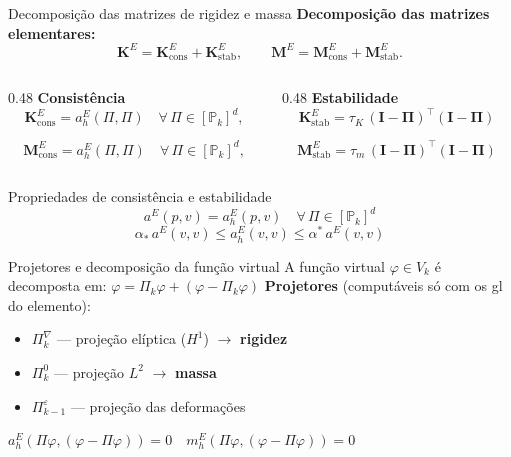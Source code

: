 \documentclass[aspectratio=169]{beamer}
\begin{document}
{\begin{frame}{Decomposição das matrizes de rigidez e massa}
  \textbf{Decomposição das matrizes elementares:}
  \[
    \mathbf{K}^E = \mathbf{K}_{\mathrm{cons}}^E + \mathbf{K}_{\mathrm{stab}}^E,
    \qquad
    \mathbf{M}^E = \mathbf{M}_{\mathrm{cons}}^E + \mathbf{M}_{\mathrm{stab}}^E.
  \]  
  \begin{columns}[T]
    \begin{column}{0.48\textwidth}
      \textbf{Consistência}
      \[
        \mathbf{K}_{\mathrm{cons}}^E  = a_h^E(\Pi,\Pi)\quad\forall\, \Pi \in[\mathbb{P}_k]^d,
      \]

      \[ \mathbf{M}_{\mathrm{cons}}^E  = a_h^E(\Pi,\Pi)\quad\forall\, \Pi \in[\mathbb{P}_k]^d,
      \]
    \end{column}
    \begin{column}{0.48\textwidth}
      \textbf{Estabilidade}
      \[
        \mathbf{K}_{\mathrm{stab}}^E = \tau_K\,
        (\mathbf{I}-\boldsymbol{\Pi})^\top
        (\mathbf{I}-\boldsymbol{\Pi})
      \]

      \[\mathbf{M}_{\mathrm{stab}}^E = \tau_m\,
        (\mathbf{I}-\boldsymbol{\Pi})^\top
        (\mathbf{I}-\boldsymbol{\Pi})
      \]
    \end{column}
  \end{columns}  
  \begin{block}{Propriedades de consistência e estabilidade}
      \[
        a^E(p,v) = a_h^E(p,v)
        \quad\forall\, \Pi \in[\mathbb{P}_k]^d
      \]  \[
        \alpha_*\, a^E(v,v) \leq
        a_h^E(v,v) \leq
        \alpha^*\, a^E(v,v)
      \]
  \end{block}
\end{frame}

\begin{frame}{Projetores e decomposição da função virtual}
  A função virtual $\varphi \in V_k$ é decomposta em: $\varphi = \Pi_k \varphi + (\varphi - \Pi_k \varphi)$
  \textbf{Projetores} (computáveis só com os gl do elemento):
  \vspace{1em}
  \begin{itemize}
    \item $\Pi_k^\nabla$ --- projeção elíptica ($H^1$) $\rightarrow$ \textbf{rigidez}
    \item $\Pi_k^0$ --- projeção $L^2$ $\rightarrow$ \textbf{massa}
    \item $\Pi_{k-1}^\varepsilon$ --- projeção das deformações
  \end{itemize}
  \vspace{2em}
  \centering
  $a_h^E(\Pi \varphi, (\varphi - \Pi \varphi)) = 0 \quad m_h^E(\Pi \varphi, (\varphi - \Pi \varphi)) = 0$
\end{frame}

}
\end{document}
